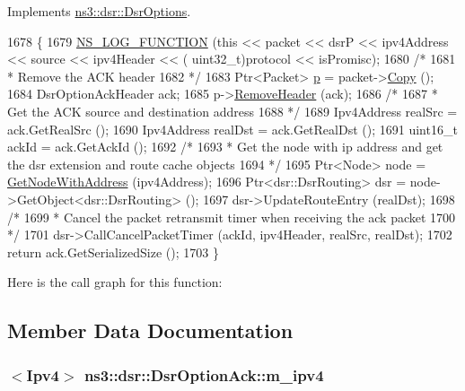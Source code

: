 Implements \hyperlink{classns3_1_1dsr_1_1DsrOptions_ac34fb87a95464f3ea9d82ad12253a5cc}{ns3\+::dsr\+::\+Dsr\+Options}.


\begin{DoxyCode}
1678 \{
1679   \hyperlink{log-macros-disabled_8h_a90b90d5bad1f39cb1b64923ea94c0761}{NS\_LOG\_FUNCTION} (\textcolor{keyword}{this} << packet << dsrP << ipv4Address << source << ipv4Header << (
      uint32\_t)protocol << isPromisc);
1680   \textcolor{comment}{/*}
1681 \textcolor{comment}{   * Remove the ACK header}
1682 \textcolor{comment}{   */}
1683   Ptr<Packet> \hyperlink{lte__link__budget_8m_ac9de518908a968428863f829398a4e62}{p} = packet->\hyperlink{classns3_1_1Packet_a5d5c70802a5f77fc5f0001e0cfc1898b}{Copy} ();
1684   DsrOptionAckHeader ack;
1685   p->\hyperlink{classns3_1_1Packet_a0961eccf975d75f902d40956c93ba63e}{RemoveHeader} (ack);
1686   \textcolor{comment}{/*}
1687 \textcolor{comment}{   * Get the ACK source and destination address}
1688 \textcolor{comment}{   */}
1689   Ipv4Address realSrc = ack.GetRealSrc ();
1690   Ipv4Address realDst = ack.GetRealDst ();
1691   uint16\_t ackId = ack.GetAckId ();
1692   \textcolor{comment}{/*}
1693 \textcolor{comment}{   * Get the node with ip address and get the dsr extension and route cache objects}
1694 \textcolor{comment}{   */}
1695   Ptr<Node> node = \hyperlink{classns3_1_1dsr_1_1DsrOptions_a1a91f820f3d754a477a54bad547ca659}{GetNodeWithAddress} (ipv4Address);
1696   Ptr<dsr::DsrRouting> dsr = node->GetObject<dsr::DsrRouting> ();
1697   dsr->UpdateRouteEntry (realDst);
1698   \textcolor{comment}{/*}
1699 \textcolor{comment}{   * Cancel the packet retransmit timer when receiving the ack packet}
1700 \textcolor{comment}{   */}
1701   dsr->CallCancelPacketTimer (ackId, ipv4Header, realSrc, realDst);
1702   \textcolor{keywordflow}{return} ack.GetSerializedSize ();
1703 \}
\end{DoxyCode}


Here is the call graph for this function\+:




\subsection{Member Data Documentation}
\subsubsection[{\texorpdfstring{m\+\_\+ipv4}{m_ipv4}}]{$<${\bf Ipv4}$>$ ns3\+::dsr\+::\+Dsr\+Option\+Ack\+::m\+\_\+ipv4\hspace{0.3cm}{\ttfamily [private]}}\hypertarget{classns3_1_1dsr_1_1DsrOptionAck_a69aa8b04305de1a13070acca6e0c0afa}{}\label{classns3_1_1dsr_1_1DsrOptionAck_a69aa8b04305de1a13070acca6e0c0afa}



